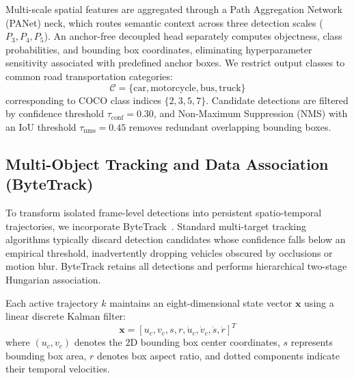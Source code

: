 \documentclass[conference]{IEEEtran}
\begin{document}
Multi-scale spatial features are aggregated through a Path Aggregation Network (PANet) neck, which routes semantic context across three detection scales ($P_3, P_4, P_5$). An anchor-free decoupled head separately computes objectness, class probabilities, and bounding box coordinates, eliminating hyperparameter sensitivity associated with predefined anchor boxes. We restrict output classes to common road transportation categories:
\begin{equation}
\mathcal{C} = \{\text{car}, \text{motorcycle}, \text{bus}, \text{truck}\}
\end{equation}
corresponding to COCO class indices $\{2, 3, 5, 7\}$. Candidate detections are filtered by confidence threshold $\tau_{\text{conf}} = 0.30$, and Non-Maximum Suppression (NMS) with an IoU threshold $\tau_{\text{nms}} = 0.45$ removes redundant overlapping bounding boxes.

\subsection{Multi-Object Tracking and Data Association (ByteTrack)}
To transform isolated frame-level detections into persistent spatio-temporal trajectories, we incorporate ByteTrack~\cite{zhang2022bytetrack}. Standard multi-target tracking algorithms typically discard detection candidates whose confidence falls below an empirical threshold, inadvertently dropping vehicles obscured by occlusions or motion blur. ByteTrack retains all detections and performs hierarchical two-stage Hungarian association.

Each active trajectory $k$ maintains an eight-dimensional state vector $\mathbf{x}$ using a linear discrete Kalman filter:
\begin{equation}
\mathbf{x} = [u_c, v_c, s, r, \dot{u}_c, \dot{v}_c, \dot{s}, \dot{r}]^T
\end{equation}
where $(u_c, v_c)$ denotes the 2D bounding box center coordinates, $s$ represents bounding box area, $r$ denotes box aspect ratio, and dotted components indicate their temporal velocities.
\end{document}
